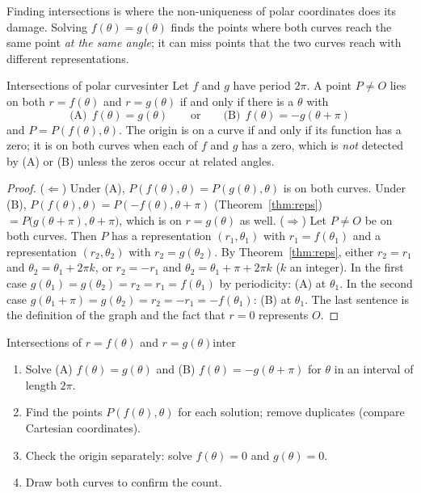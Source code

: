 \documentclass[11pt]{article}
\begin{document}
Finding intersections is where the non-uniqueness of polar coordinates does its damage. Solving $f(\theta)=g(\theta)$ finds the points where both curves reach the same point \emph{at the same angle}; it can miss points that the two curves reach with different representations.

\begin{thm}{Intersections of polar curves}{inter}
Let $f$ and $g$ have period $2\pi$. A point $P\ne O$ lies on both $r=f(\theta)$ and $r=g(\theta)$ if and only if there is a $\theta$ with
\[
\text{(A)}\ \ f(\theta)=g(\theta)\qquad\text{or}\qquad\text{(B)}\ \ f(\theta)=-g(\theta+\pi)
\]
and $P=P(f(\theta),\theta)$. The origin is on a curve if and only if its function has a zero; it is on both curves when each of $f$ and $g$ has a zero, which is \emph{not} detected by (A) or (B) unless the zeros occur at related angles.
\end{thm}
\begin{proof}
($\Leftarrow$) Under (A), $P(f(\theta),\theta)=P(g(\theta),\theta)$ is on both curves. Under (B), $P(f(\theta),\theta)=P(-f(\theta),\theta+\pi)$ (Theorem~\ref{thm:reps}) $=P\bigl(g(\theta+\pi),\theta+\pi\bigr)$, which is on $r=g(\theta)$ as well.
($\Rightarrow$) Let $P\ne O$ be on both curves. Then $P$ has a representation $(r_1,\theta_1)$ with $r_1=f(\theta_1)$ and a representation $(r_2,\theta_2)$ with $r_2=g(\theta_2)$. By Theorem~\ref{thm:reps}, either $r_2=r_1$ and $\theta_2=\theta_1+2\pi k$, or $r_2=-r_1$ and $\theta_2=\theta_1+\pi+2\pi k$ ($k$ an integer). In the first case $g(\theta_1)=g(\theta_2)=r_2=r_1=f(\theta_1)$ by periodicity: (A) at $\theta_1$. In the second case $g(\theta_1+\pi)=g(\theta_2)=r_2=-r_1=-f(\theta_1)$: (B) at $\theta_1$. The last sentence is the definition of the graph and the fact that $r=0$ represents $O$.
\end{proof}

\begin{proc}{Intersections of $r=f(\theta)$ and $r=g(\theta)$}{inter}
\begin{enumerate}[nosep]
  \item Solve (A) $f(\theta)=g(\theta)$ and (B) $f(\theta)=-g(\theta+\pi)$ for $\theta$ in an interval of length $2\pi$.
  \item Find the points $P(f(\theta),\theta)$ for each solution; remove duplicates (compare Cartesian coordinates).
  \item Check the origin separately: solve $f(\theta)=0$ and $g(\theta)=0$.
  \item Draw both curves to confirm the count.
\end{enumerate}
\end{proc}
\end{document}
